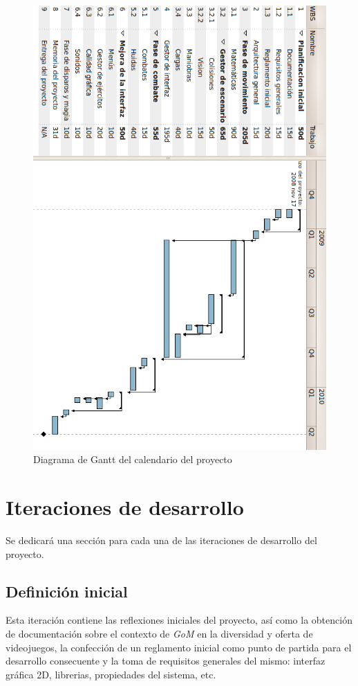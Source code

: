 \documentclass[a4paper,11pt]{article} %
\begin{document}
\begin{figure}[h]
  \centering
  \includegraphics[scale=.5]{./imagenes/Gantt.png}
  \caption{Diagrama de Gantt del calendario del proyecto}
  \label{fig:gantt}
\end{figure}

\section{Iteraciones de desarrollo}
\noindent
Se dedicará una sección para cada una de las iteraciones de desarrollo
del proyecto.

\subsection{Definición inicial}
\label{sec:def}
\noindent
Esta iteración contiene las reflexiones iniciales del proyecto, así
como la obtención de documentación sobre el contexto de \emph{GoM} en
la diversidad y oferta de videojuegos, la confección de un reglamento
inicial como punto de partida para el desarrollo consecuente y la toma
de requisitos generales del mismo: interfaz gráfica 2D, librerias,
propiedades del sistema, etc.
\end{document}
